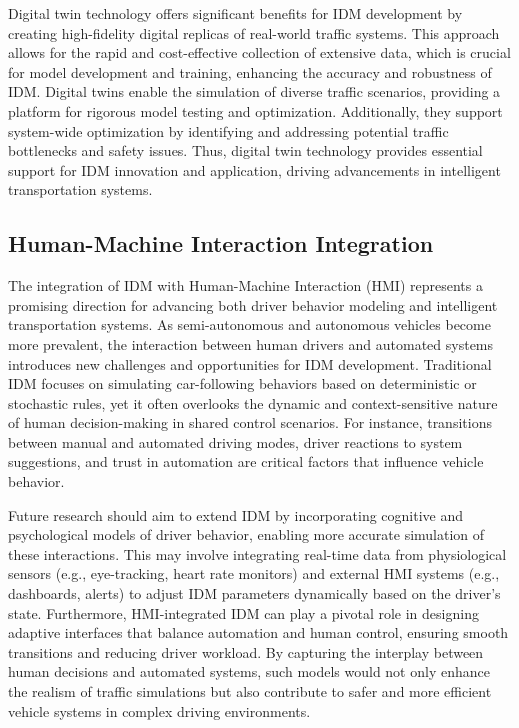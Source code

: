 \documentclass[a4paper,fleqn]{cas-sc}
\begin{document}
Digital twin technology offers significant benefits for IDM development by creating high-fidelity digital replicas of real-world traffic systems. This approach allows for the rapid and cost-effective collection of extensive data, which is crucial for model development and training, enhancing the accuracy and robustness of IDM. Digital twins enable the simulation of diverse traffic scenarios, providing a platform for rigorous model testing and optimization. Additionally, they support system-wide optimization by identifying and addressing potential traffic bottlenecks and safety issues. Thus, digital twin technology provides essential support for IDM innovation and application, driving advancements in intelligent transportation systems.

\subsection{Human-Machine Interaction Integration}

The integration of IDM with Human-Machine Interaction (HMI) represents a promising direction for advancing both driver behavior modeling and intelligent transportation systems. As semi-autonomous and autonomous vehicles become more prevalent, the interaction between human drivers and automated systems introduces new challenges and opportunities for IDM development. Traditional IDM focuses on simulating car-following behaviors based on deterministic or stochastic rules, yet it often overlooks the dynamic and context-sensitive nature of human decision-making in shared control scenarios. For instance, transitions between manual and automated driving modes, driver reactions to system suggestions, and trust in automation are critical factors that influence vehicle behavior.

Future research should aim to extend IDM by incorporating cognitive and psychological models of driver behavior, enabling more accurate simulation of these interactions. This may involve integrating real-time data from physiological sensors (e.g., eye-tracking, heart rate monitors) and external HMI systems (e.g., dashboards, alerts) to adjust IDM parameters dynamically based on the driver's state. Furthermore, HMI-integrated IDM can play a pivotal role in designing adaptive interfaces that balance automation and human control, ensuring smooth transitions and reducing driver workload. By capturing the interplay between human decisions and automated systems, such models would not only enhance the realism of traffic simulations but also contribute to safer and more efficient vehicle systems in complex driving environments.
\end{document}
